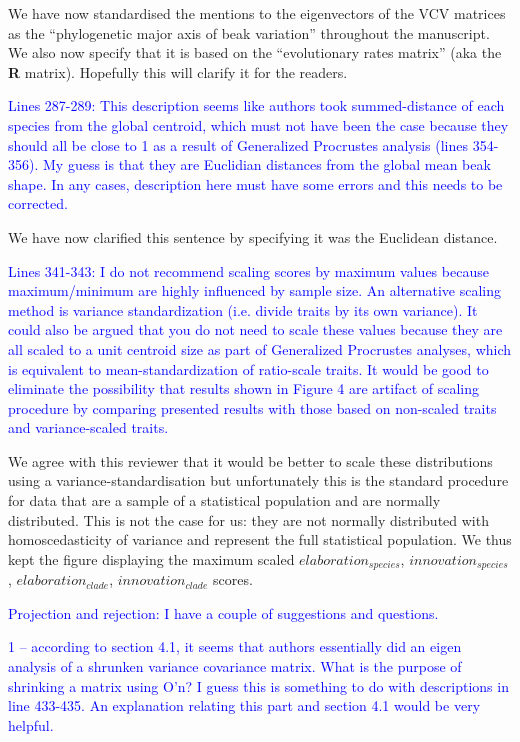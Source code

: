 \documentclass[12pt,letterpaper]{article}
\begin{document}
{We have now standardised the mentions to the eigenvectors of the VCV matrices as the “phylogenetic major axis of beak variation” throughout the manuscript. We also now specify that it is based on the “evolutionary rates matrix” (aka the \textbf{R} matrix). Hopefully this will clarify it for the readers.

\textcolor{blue}{Lines 287-289: This description seems like authors took summed-distance of each species from the global centroid, which must not have been the case because they should all be close to 1 as a result of Generalized Procrustes analysis (lines 354-356). My guess is that they are Euclidian distances from the global mean beak shape. In any cases, description here must have some errors and this needs to be corrected.}

We have now clarified this sentence by specifying it was the Euclidean distance.

\textcolor{blue}{Lines 341-343: I do not recommend scaling scores by maximum values because maximum/minimum are highly influenced by sample size. An alternative scaling method is variance standardization (i.e. divide traits by its own variance). It could also be argued that you do not need to scale these values because they are all scaled to a unit centroid size as part of Generalized Procrustes analyses, which is equivalent to mean-standardization of ratio-scale traits. It would be good to eliminate the possibility that results shown in Figure 4 are artifact of scaling procedure by comparing presented results with those based on non-scaled traits and variance-scaled traits.}

We agree with this reviewer that it would be better to scale these distributions using a variance-standardisation but unfortunately this is the standard procedure for data that are a sample of a statistical population and are normally distributed. This is not the case for us: they are not normally distributed with homoscedasticity of variance and represent the full statistical population. We thus kept the figure displaying the maximum scaled $elaboration_{species}$, $innovation_{species}$, $elaboration_{clade}$, $innovation_{clade}$ scores.


\textcolor{blue}{Projection and rejection: I have a couple of suggestions and questions.}

\textcolor{blue}{1 – according to section 4.1, it seems that authors essentially did an eigen analysis of a shrunken variance covariance matrix. What is the purpose of shrinking a matrix using O’n? I guess this is something to do with descriptions in line 433-435. An explanation relating this part and section 4.1 would be very helpful.}

}
\end{document}

